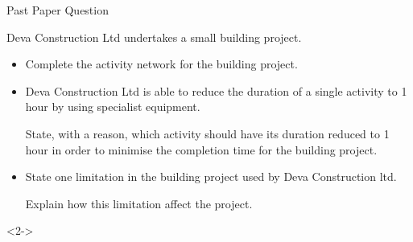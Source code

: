 \documentclass[8pt]{beamer}
\def\height{0.8cm}
\def\width{1.2cm}
\newcommand{\keynode}[6]{\node[minimum height=\height,minimum width=\width,draw,rectangle,color=aa,fill=cc] (#3) at (#1,#2) {};
	\node[rectangle,minimum height=\height/2,minimum width=\width,above,color=aa,fill=cc] at (#3) {#3};
	\node[draw,rectangle,minimum height=\height/2,minimum width=\width/3,below,color=aa,fill=cc,inner sep =0cm] at (#3) {\footnotesize#4};
	\node[draw,rectangle,minimum height=\height/2,minimum width=\width/3,below,xshift=\height/2,color=aa,fill=cc,inner sep=0cm] at (#3) {\footnotesize#5};
	\node[draw,rectangle,minimum height=\height/2,minimum width=\width/3,below,xshift=-\height/2,color=aa,fill=cc,inner sep=0cm] at (#3) {\footnotesize#6}; }
\begin{document}
\begin{frame}[allowframebreaks]{Past Paper Question}
	\begin{problem}
		Deva Construction Ltd undertakes a small building project. 

		\begin{center}
			
		\end{center}

		\begin{itemize}
			\item Complete the activity network for the building project.
			\item Deva Construction Ltd is able to reduce the duration of a single activity to 1 hour by using specialist equipment.

				State, with a reason, which activity should have its duration reduced to 1 hour in order to minimise the completion time for the building project.
			\item State one limitation in the building project used by Deva Construction ltd.

				Explain how this limitation affect the project.
		\end{itemize}

	\end{problem}

\begin{solution}<2->
	

		\begin{center}
\end{center}
\end{solution}
\end{frame}
\end{document}
